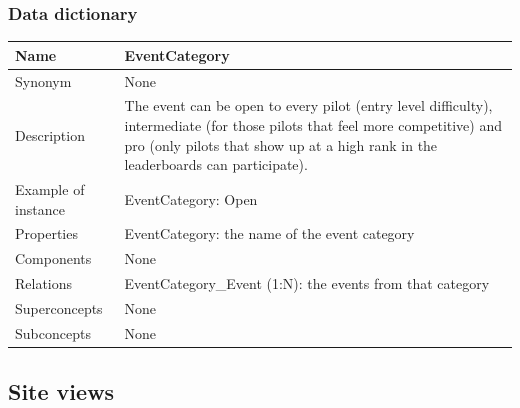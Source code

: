 \documentclass{beamer}
\begin{document}
\begin{frame}
    \frametitle{Data dictionary}
    \begin{table}
    \tiny
    \begin{tabular}{|p{2cm}|p{6cm}|}
    \hline
    Name & \textbf{EventCategory} \\
    \hline
    Synonym & None \\
    \hline
    Description & The event can be open to every pilot (entry level difficulty),
    intermediate (for those pilots that feel more competitive) and 
    pro (only pilots that show up at a high rank in the leaderboards can participate). \\
    \hline
    Example of instance &
    EventCategory: Open \\
    \hline
    Properties &
    EventCategory: the name of the event category \\
    \hline
    Components & None \\
    \hline
    Relations &
    EventCategory\_Event (1:N): the events from that category \\
    \hline
    Superconcepts & None \\
    \hline
    Subconcepts & None \\
    \hline
    \end{tabular}
    \end{table}
\end{frame}

\subsection*{Site views}
\end{document}
